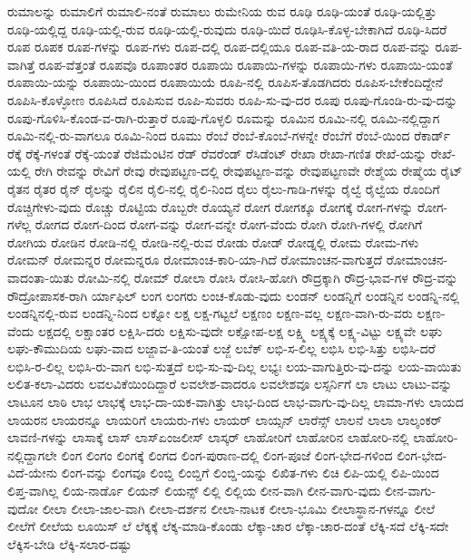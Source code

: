 {ರುಮಾಲನ್ನು
ರುಮಾಲಿಗೆ
ರುಮಾಲಿ-ನಂತೆ
ರುಮಾಲು
ರುಮೇನಿಯ
ರುವ
ರೂಢಿ
ರೂಢಿ-ಯಂತೆ
ರೂಢಿ-ಯಲ್ಲಿತ್ತು
ರೂಢಿ-ಯಲ್ಲಿದ್ದ
ರೂಢಿ-ಯಲ್ಲಿ-ರುವ
ರೂಢಿ-ಯಲ್ಲಿ-ರುವುದು
ರೂಢಿ-ಯಿದೆ
ರೂಢಿಸಿ-ಕೊಳ್ಳ-ಬೇಕಾಗಿದೆ
ರೂಢಿ-ಸಿದರೆ
ರೂಪ
ರೂಪಕ
ರೂಪ-ಗಳನ್ನು
ರೂಪ-ಗಳು
ರೂಪ-ದಲ್ಲಿ
ರೂಪ-ದಲ್ಲಿಯೂ
ರೂಪ-ವತಿ-ಯ-ರಾದ
ರೂಪ-ವನ್ನು
ರೂಪ-ವಾಗಿತ್ತೆ
ರೂಪ-ವೆತ್ತಂತೆ
ರೂಪವೊ
ರೂಪಾಂತರ
ರೂಪಾಯಿ
ರೂಪಾಯಿ-ಗಳನ್ನು
ರೂಪಾಯಿ-ಗಳು
ರೂಪಾಯಿ-ಯಂತೆ
ರೂಪಾಯಿ-ಯನ್ನು
ರೂಪಾಯಿ-ಯಿಂದ
ರೂಪಾಯಿಯೆ
ರೂಪಿ-ನಲ್ಲಿ
ರೂಪಿಸ-ತೊಡಗಿದರು
ರೂಪಿಸ-ಬೇಕೆಂದಿದ್ದೇನೆ
ರೂಪಿಸಿ-ಕೊಳ್ಳೋಣ
ರೂಪಿಸಿದೆ
ರೂಪಿಸುವ
ರೂಪಿ-ಸುವರು
ರೂಪಿ-ಸು-ವು-ದರ
ರೂಪು
ರೂಪು-ಗೊಂಡಿ-ರು-ವು-ದನ್ನು
ರೂಪು-ಗೊಳಿಸಿ-ಕೊಂಡ-ವ-ರಾಗಿ-ರುತ್ತಾರೆ
ರೂಪು-ಗೊಳ್ಳಲಿ
ರೂಮನ್ನು
ರೂಮಿನ
ರೂಮಿ-ನಲ್ಲಿ
ರೂಮಿ-ನಲ್ಲಿದ್ದಾಗ
ರೂಮಿ-ನಲ್ಲಿ-ರು-ವಾಗಲೂ
ರೂಮಿ-ನಿಂದ
ರೂಮು
ರೆಂಬೆ
ರೆಂಬೆ-ಕೊಂಬೆ-ಗಳನ್ನೇ
ರೆಂಬೆಗೆ
ರೆಂಬೆ-ಯಿಂದ
ರೆಕಾರ್ಡ್
ರೆಕ್ಕೆ
ರೆಕ್ಕೆ-ಗಳಂತೆ
ರೆಕ್ಕೆ-ಯಂತೆ
ರೆಜಿಮೆಂಟಿನ
ರೆಡ್
ರೆವರೆಂಡ್
ರೆಸಿಡೆಂಟ್
ರೇಖಾ
ರೇಖಾ-ಗಣಿತ
ರೇಖೆ-ಯನ್ನು
ರೇಖೆ-ಯಲ್ಲಿ
ರೇಗಿ
ರೇವನ್ನು
ರೇವಿಗೆ
ರೇವು
ರೇವುಪಟ್ಟಣ-ದಲ್ಲಿ
ರೇವುಪಟ್ಟಣ-ವನ್ನು
ರೇವುಪಟ್ಟಣವೇ
ರೇಶ್ಮೆಯ
ರೇಷ್ಮೆಯ
ರೈಟ್
ರೈತನ
ರೈತರ
ರೈನ್
ರೈಲನ್ನು
ರೈಲಿನ
ರೈಲಿ-ನಲ್ಲಿ
ರೈಲಿ-ನಿಂದ
ರೈಲು
ರೈಲು-ಗಾಡಿ-ಗಳನ್ನು
ರೈಲ್ವೆ
ರೈಲ್ವೆಯ
ರೊಂದಿಗೆ
ರೊಚ್ಚಿಗೇಳು-ವುದು
ರೊಚ್ಚು
ರೊಟ್ಟಿಯ
ರೊಬ್ಬರೇ
ರೊಯ್ಯನೆ
ರೋಗ
ರೋಗಕ್ಕೂ
ರೋಗಕ್ಕೆ
ರೋಗ-ಗಳನ್ನು
ರೋಗ-ಗಳೆಲ್ಲ
ರೋಗದ
ರೋಗ-ದಿಂದ
ರೋಗ-ವನ್ನು
ರೋಗ-ವನ್ನೇ
ರೋಗ-ವೆಂದು
ರೋಗಿ
ರೋಗಿ-ಗಳಲ್ಲಿ
ರೋಗಿಗೆ
ರೋಗಿಯ
ರೋಡಿನ
ರೋಡಿ-ನಲ್ಲಿ
ರೋಡಿ-ನಲ್ಲಿ-ರುವ
ರೋಡು
ರೋಡ್
ರೋಡ್ನಲ್ಲಿ
ರೋಮ
ರೋಮ-ಗಳು
ರೋಮನ್
ರೋಮನ್ನರ
ರೋಮನ್ನರೂ
ರೋಮಾಂಚ-ಕಾರಿ-ಯಾ-ಗಿದೆ
ರೋಮಾಂಚನ-ವಾಗುತ್ತದೆ
ರೋಮಾಂಚನ-ವಾದಂತಾ-ಯಿತು
ರೋಮಿ-ನಲ್ಲಿ
ರೋಮ್
ರೋಲಾ
ರೋಸಿ
ರೋಸಿ-ಹೋಗಿ
ರೌದ್ರಕ್ಕಾಗಿ
ರೌದ್ರ-ಭಾವ-ಗಳ
ರೌದ್ರ-ವನ್ನು
ರೌದ್ರೋಪಾಸಕ-ರಾಗಿ
ರ್ಯಾಫಿಲ್
ಲಂಗ
ಲಂಗರು
ಲಂಚ-ಕೊಡು-ವುದು
ಲಂಡನ್
ಲಂಡನ್ನಿಗೆ
ಲಂಡನ್ನಿನ
ಲಂಡನ್ನಿ-ನಲ್ಲಿ
ಲಂಡನ್ನಿನಲ್ಲಿ-ರುವ
ಲಂಡನ್ನಿ-ನಿಂದ
ಲಕ್ನೋ
ಲಕ್ಷ
ಲಕ್ಷ-ಗಟ್ಟಲೆ
ಲಕ್ಷಣಂ
ಲಕ್ಷಣ-ವಲ್ಲ
ಲಕ್ಷಣ-ವಾಗಿ-ರು-ವರು
ಲಕ್ಷಣ-ವೆಂದು
ಲಕ್ಷದಲ್ಲಿ
ಲಕ್ಷಾಂತರ
ಲಕ್ಷಿಸಿ-ದರು
ಲಕ್ಷಿಸು-ವುದೇ
ಲಕ್ಷೋಪ-ಲಕ್ಷ
ಲಕ್ಷ್ಮಿ
ಲಕ್ಷ್ಯಕ್ಕೆ
ಲಕ್ಷ್ಯ-ವಿಟ್ಟು
ಲಕ್ಷ್ಯವೇ
ಲಘು
ಲಘು-ಕೌಮುದಿಯ
ಲಘು-ವಾದ
ಲಜ್ಜಾವ-ತಿ-ಯಂತೆ
ಲಜ್ಜೆ
ಲಬೆಕ್
ಲಭಿ-ಸ-ಲಿಲ್ಲ
ಲಭಿಸಿ
ಲಭಿ-ಸಿತ್ತು
ಲಭಿಸಿ-ದರೆ
ಲಭಿಸಿ-ರ-ಲಿಲ್ಲ
ಲಭಿಸಿ-ರು-ವಾಗ
ಲಭಿ-ಸುತ್ತದೆ
ಲಭಿ-ಸು-ವು-ದಿಲ್ಲ
ಲಭ್ಯಃ
ಲಯ-ವಾಗುತ್ತಿರು-ವು-ದನ್ನು
ಲಯ-ವಾಯಿತು
ಲಲಿತ-ಕಲಾ-ವಿದರು
ಲವಲವಿಕೆಯಿಂದಿದ್ದಾರೆ
ಲವಲೇಶ-ವಾದರೂ
ಲವಲೇಶವೂ
ಲಸ್ಸರ್ನಿಗೆ
ಲಾ
ಲಾಟು
ಲಾಟು-ವನ್ನು
ಲಾಟೂನ
ಲಾಠಿ
ಲಾಭ
ಲಾಭಕ್ಕೆ
ಲಾಭ-ದಾ-ಯಕ-ವಾಗಿತ್ತು
ಲಾಭ-ದಿಂದ
ಲಾಭ-ವಾಗು-ವು-ದಿಲ್ಲ
ಲಾಮಾ-ಗಳು
ಲಾಯದ
ಲಾಯರನ
ಲಾಯರನ್ನೂ
ಲಾಯರಿಗೆ
ಲಾಯರು-ಗಳು
ಲಾಯರ್
ಲಾಯ್ಸನ್
ಲಾರೆನ್ಸ್
ಲಾಲನೆ
ಲಾಲಾ
ಲಾಲ್ಶಂಕರ್
ಲಾವಣಿ-ಗಳನ್ನು
ಲಾಸಾಕ್ಕೆ
ಲಾಸ್
ಲಾಸ್ಏಂಜಲೀಸ್
ಲಾಸ್ಕರ್
ಲಾಹೋರಿಗೆ
ಲಾಹೋರಿನ
ಲಾಹೋರಿ-ನಲ್ಲಿ
ಲಾಹೋರಿ-ನಲ್ಲಿದ್ದಾಗಲೇ
ಲಿಂಗ
ಲಿಂಗಂ
ಲಿಂಗಕ್ಕೆ
ಲಿಂಗದ
ಲಿಂಗ-ಪುರಾಣ-ದಲ್ಲಿ
ಲಿಂಗ-ಪೂಜೆ
ಲಿಂಗ-ಭೇದ-ಗಳಿಂದ
ಲಿಂಗ-ಭೇದ-ವಿದೆ-ಯೇನು
ಲಿಂಗ-ವನ್ನು
ಲಿಂಗವೂ
ಲಿಂಬ್ಡಿ
ಲಿಂಬ್ಡಿಗೆ
ಲಿಂಬ್ಡಿ-ಯನ್ನು
ಲಿಖಿತ-ಗಳು
ಲಿಚಿ
ಲಿಪಿ-ಯಲ್ಲಿ
ಲಿಪಿ-ಯಿಂದ
ಲಿಪ್ತ-ವಾಗಿಲ್ಲ
ಲಿಯ-ನಾರ್ಡೊ
ಲಿಯನ್
ಲಿಯನ್ಸ್
ಲಿಲ್ಲಿ
ಲಿಲ್ಲಿಯ
ಲೀನ-ವಾಗಿ
ಲೀನ-ವಾಗು-ವುದು
ಲೀನ-ವಾಗು-ವುದೋ
ಲೀಲಾ
ಲೀಲಾ-ಜಾಲ-ವಾಗಿ
ಲೀಲಾ-ದರ್ಶನ
ಲೀಲಾ-ನಾಟಕ
ಲೀಲಾ-ಭೂಮಿ
ಲೀಲಾಸ್ಥಾನ-ಗಳನ್ನೂ
ಲೀಲೆ
ಲೀಲೆಗೆ
ಲೀಲೆಯ
ಲೂಯಿಸ್
ಲೆ
ಲೆಕ್ಕಕ್ಕೆ
ಲೆಕ್ಕ-ಮಾಡಿ-ಕೊಂಡು
ಲೆಕ್ಕಾ-ಚಾರ
ಲೆಕ್ಕಾ-ಚಾರ-ದಂತೆ
ಲೆಕ್ಕಿ-ಸದೆ
ಲೆಕ್ಕಿ-ಸದೇ
ಲೆಕ್ಕಿಸ-ಬೇಡಿ
ಲೆಕ್ಕಿ-ಸಲಾರ-ದಷ್ಟು
}

